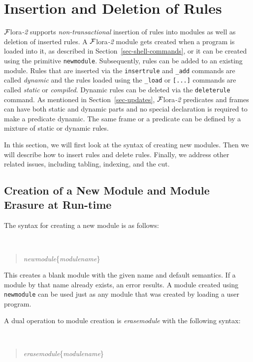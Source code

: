 \documentclass[11pt]{article}
\newcommand{\FLORA}{{\mbox{\sc ${\cal F}${lora}\rm\emph{-2}}}\xspace}
\begin{document}
\section{Insertion and Deletion of Rules}
\label{sec-rule-update}

\FLORA supports \emph{non-transactional} insertion of rules into modules as
well as deletion of inserted rules.  A \FLORA module gets created when a
program is loaded into it, as described in
Section~\ref{sec-shell-commands}, or it can be created using the primitive
{\tt newmodule}. Subsequently, rules can be added to an existing module.
Rules that are inserted via the {\tt insertrule} and {\tt \_add} commands
are called \emph{dynamic} and the rules loaded using the {\tt \_load} or
{\tt [...]} commands are called \emph{static} or \emph{compiled}.  Dynamic
rules can be deleted via the {\tt deleterule} command. As mentioned in
Section~\ref{sec-updates}, \FLORA predicates and frames can have both
static and dynamic parts and no special declaration is required to make a
predicate dynamic. The same frame or a predicate can be defined by a
mixture of static or dynamic rules.

In this section, we will first look at the syntax of creating new
modules.  Then we will describe how to insert rules and delete
rules. Finally, we address other related issues, including tabling,
indexing, and the cut.


\subsection{Creation of a New Module and Module Erasure at Run-time}


The syntax for creating a new module is as follows:
{\tt
\begin{quote}
\emph{newmodule}\{\emph{modulename}\}
\end{quote}
}
\noindent
This creates a blank module with the given name and default semantics.  If
a module by that name already exists, an error results.  A module created
using {\tt newmodule} can be used just as any module that
was created by loading a user program.

A dual operation to module creation
is \emph{erasemodule} with the following syntax:
{\tt
\begin{quote}
\emph{erasemodule}\{\emph{modulename}\}
\end{quote}
}
\end{document}

